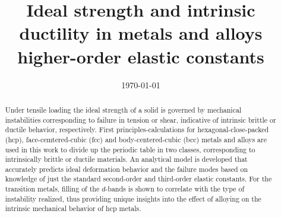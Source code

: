\documentclass[showpacs,aps,floatfix,prb,reprint,superscriptaddress]{revtex4-1}
\begin{document}
\title{\Large Ideal strength and intrinsic ductility in metals and alloys higher-order elastic constants}


\date{\today}

\begin{abstract}
Under tensile loading the ideal strength of a solid is governed by mechanical instabilities corresponding to failure in tension or shear, indicative of intrinsic brittle or ductile behavior, respectively.  First principles-calculations for hexagonal-close-packed (hcp), face-cemtered-cubic (fcc) and body-centered-cubic (bcc) metals and alloys are used in this work to divide up the periodic table in two classes, corresponding to intrinsically brittle or ductile materials. An analytical model is developed that accurately predicts ideal deformation behavior and the failure modes based on knowledge of just the standard second-order and third-order elastic constants. For the transition metals, filling of the $d$-bands is shown to correlate with the type of instability realized, thus providing unique insights into the effect of alloying on the intrinsic mechanical behavior of hcp metals.
\end{abstract}

\maketitle
\end{document}

